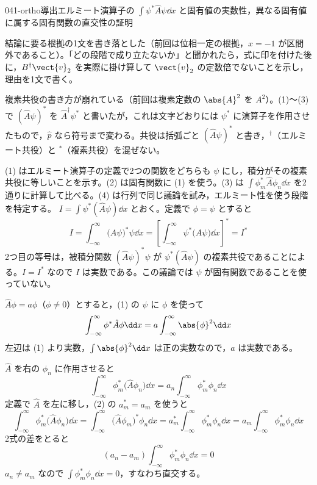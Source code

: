 \documentclass[uplatex,dvipdfmx,a4paper,11pt]{jsarticle}
\begin{document}
\begin{mondai}{041-ortho}{導出}{エルミート演算子の $\int\psi^{*}\hat{A}\psi\dd x$ と固有値の実数性，異なる固有値に属する固有関数の直交性の証明}
\begin{kizuki}
\item {} 結論に要る根拠の1文を書き落とした（前回は位相一定の根拠，$x=-1$ が区間外であること）。「どの段階で成り立たないか」と聞かれたら，式に印を付けた後に，$B^{\dagger}\vect{v}_{2}$ を実際に掛け算して $\vect{v}_{2}$ の定数倍でないことを示し，理由を1文で書く。
\item {} 複素共役の書き方が崩れている（前回は複素定数の $\abs{A}^{2}$ を $A^{2}$）。(1)〜(3) で $(\hat{A}\psi)^{*}$ を $\hat{A}^{\dagger}\psi^{*}$ と書いたが，これは文字どおりには $\psi^{*}$ に演算子を作用させたもので，$\hat{p}$ なら符号まで変わる。共役は括弧ごと $(\hat{A}\psi)^{*}$ と書き，$^{\dagger}$（エルミート共役）と $^{*}$（複素共役）を混ぜない。
\end{kizuki}
\begin{tadashii}
\houshin (1) はエルミート演算子の定義で2つの関数をどちらも $\psi$ にし，積分がその複素共役に等しいことを示す。(2) は固有関数に (1) を使う。(3) は $\int\phi_{m}^{*}\hat{A}\phi_{n}\dd x$ を2通りに計算して比べる。(4) は行列で同じ議論を試み，エルミート性を使う段階を特定する。
\keisan {} $I=\int\psi^{*}(\hat{A}\psi)\dd x$ とおく。定義で $\phi=\psi$ とすると
\[
  I=\int_{-\infty}^{\infty}\bigl(\hat{A}\psi\bigr)^{*}\psi\dd x=\left[\int_{-\infty}^{\infty}\psi^{*}\bigl(\hat{A}\psi\bigr)\dd x\right]^{*}=I^{*}
\]
2つ目の等号は，被積分関数 $(\hat{A}\psi)^{*}\psi$ が $\psi^{*}(\hat{A}\psi)$ の複素共役であることによる。$I=I^{*}$ なので $I$ は実数である。この議論では $\psi$ が固有関数であることを使っていない。

 $\hat{A}\phi=a\phi$（$\phi\neq0$）とすると，(1) の $\psi$ に $\phi$ を使って
\[
  \int_{-\infty}^{\infty}\phi^{*}\hat{A}\phi\dd x=a\int_{-\infty}^{\infty}\abs{\phi}^{2}\dd x
\]
左辺は (1) より実数，$\int\abs{\phi}^{2}\dd x$ は正の実数なので，$a$ は実数である。

 $\hat{A}$ を右の $\phi_{n}$ に作用させると
\[
  \int_{-\infty}^{\infty}\phi_{m}^{*}\bigl(\hat{A}\phi_{n}\bigr)\dd x=a_{n}\int_{-\infty}^{\infty}\phi_{m}^{*}\phi_{n}\dd x
\]
定義で $\hat{A}$ を左に移し，(2) の $a_{m}^{*}=a_{m}$ を使うと
\[
  \int_{-\infty}^{\infty}\phi_{m}^{*}\bigl(\hat{A}\phi_{n}\bigr)\dd x=\int_{-\infty}^{\infty}\bigl(\hat{A}\phi_{m}\bigr)^{*}\phi_{n}\dd x=a_{m}^{*}\int_{-\infty}^{\infty}\phi_{m}^{*}\phi_{n}\dd x=a_{m}\int_{-\infty}^{\infty}\phi_{m}^{*}\phi_{n}\dd x
\]
2式の差をとると
\[
  (a_{n}-a_{m})\int_{-\infty}^{\infty}\phi_{m}^{*}\phi_{n}\dd x=0
\]
$a_{n}\neq a_{m}$ なので $\int\phi_{m}^{*}\phi_{n}\dd x=0$，すなわち直交する。


\end{tadashii}
\end{mondai}
\end{document}
